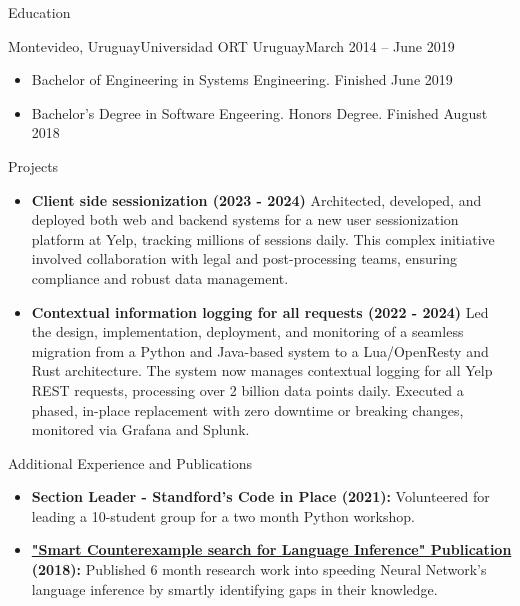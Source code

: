 \documentclass[]{mcdowellcv}
\begin{document}
	\begin{cvsection}{Education}
		\begin{cvsubsection}{Montevideo, Uruguay}{Universidad ORT Uruguay}{March 2014 -- June 2019}
			\begin{itemize}
				\item Bachelor of Engineering in Systems Engineering. Finished June 2019
				\item Bachelor's Degree in Software Engeering. Honors Degree. Finished August 2018
			\end{itemize}
		\end{cvsubsection}
	\end{cvsection}
	\begin{cvsection}{Projects}
		\begin{cvsubsection}{}{}{}
			\begin{itemize}
				\item \textbf{Client side sessionization (2023 - 2024)} Architected, developed, and deployed both web and backend systems for a new user sessionization platform at Yelp, tracking millions of sessions daily. This complex initiative involved collaboration with legal and post-processing teams, ensuring compliance and robust data management.
				\item \textbf{Contextual information logging for all requests (2022 - 2024)} Led the design, implementation, deployment, and monitoring of a seamless migration from a Python and Java-based system to a Lua/OpenResty and Rust architecture. The system now manages contextual logging for all Yelp REST requests, processing over 2 billion data points daily. Executed a phased, in-place replacement with zero downtime or breaking changes, monitored via Grafana and Splunk.
			\end{itemize}
		\end{cvsubsection}
	\end{cvsection}
	
	\begin{cvsection}{Additional Experience and Publications}
		\begin{cvsubsection}{}{}{}	
			\begin{itemize}
				\item \textbf{Section Leader - Standford's Code in Place (2021):} Volunteered for leading a 10-student group for a two month Python workshop.
				\item \textbf{\href{https://sisbibliotecas.ort.edu.uy/file/5435}{"Smart Counterexample search for Language Inference" Publication} (2018):} Published 6 month research work into speeding Neural Network's language inference by smartly identifying gaps in their knowledge.
			\end{itemize}
		\end{cvsubsection}
	\end{cvsection}
	
\end{document}
